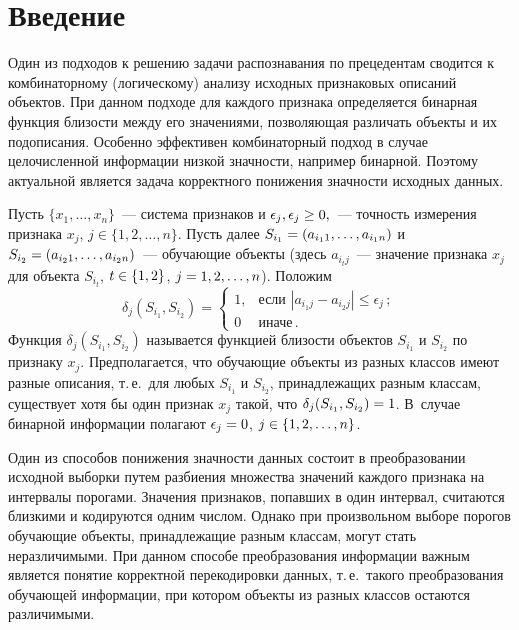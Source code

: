       \begin{multicols}{2}

            \label{st\stat}

\section{Введение}

Один из подходов к решению задачи распознавания по прецедентам
сводится к комбинаторному (логическому) анализу исходных признаковых
описаний объектов. При данном подходе для каждого признака
определяется бинарная функция близости между его значениями,
позволяющая различать объекты и их подописания. Особенно эффективен
комбинаторный подход в случае целочисленной информации низкой
значности, например бинарной. Поэтому актуальной является задача
корректного понижения значности исходных данных.

Пусть $\{x_1,\ldots ,x_n\}$~--- сис\-те\-ма признаков и $\epsilon_j,
\epsilon_j\hm\geq0,$~---  точность измерения признака $x_j$, $j \in
\{1,2,\ldots ,n\}$. Пусть далее $S_{i_1}\hm=(a_{i_11},\ldots ,a_{i_1n})$ и
$S_{i_2}\hm=(a_{i_21}, \ldots ,a_{i_2n})$~--- обучающие объекты (здесь
$a_{i_tj}$~--- значение признака $x_j$ для объекта $S_{i_t}$, $t \hm\in
\{1,2\}$, $j\hm=1,2,\ldots ,n$). Положим
$$
    \delta_j(S_{i_1},S_{i_2})=
    \begin{cases}
        1, &  \mbox{если }|a_{i_1j}-a_{i_2j}|\leq\epsilon_j\,;  \\
        0 &  \mbox{иначе}\,.
    \end{cases}
$$
Функция $\delta_j(S_{i_1},S_{i_2})$ называется функцией бли\-зости
объектов $S_{i_1}$ и $S_{i_2}$ по признаку $x_j$. Предполагается,
что обучающие объекты из разных классов имеют разные описания, т.\,е.\
для любых $S_{i_1}$ и $S_{i_2}$, принадлежащих разным классам,
существует хотя бы один признак $x_j$ такой, что
$\delta_j(S_{i_1},S_{i_2})\hm=1$. В~случае бинарной информации полагают
$\epsilon_j\hm=0$, $j\hm\in\{1,2,\ldots ,n\}$.

Один из способов понижения значности данных состоит в преобразовании
исходной выборки путем разбиения множества значений каждого признака
на интервалы порогами. Значения признаков, попавших в один интервал,
считаются близкими и кодируются одним числом. Однако при
произвольном выборе порогов обучающие объекты, принадлежащие разным
классам, могут стать неразличимыми. При данном способе
преобразования информации важным является понятие корректной
перекодировки данных, т.\,е.\ такого преобразования обучающей
информации, при котором объекты из разных классов остаются
различимыми.


\end{multicols}

